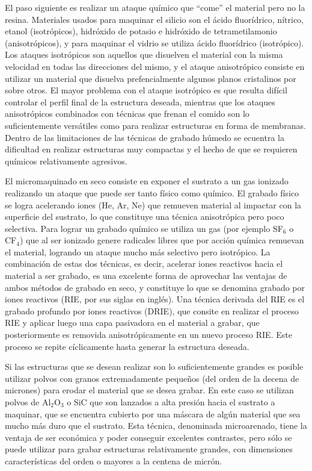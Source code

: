 \documentclass[a4paper, 12pt]{article}
\begin{document}
El paso siguiente es realizar un ataque químico que ``come'' el material pero no la resina. Materiales usados para maquinar el silicio son el ácido fluorídrico, nítrico, etanol (isotrópicos), hi\-dró\-xi\-do de potasio e hidróxido de tetrametilamonio (anisotrópicos), y para maquinar el vidrio se utiliza ácido fluorídrico (isotrópico). Los ataques isotrópicos son aquellos que disuelven el material con la misma velocidad en todas las direcciones del mismo, y el ataque anisotrópico consiste en utilizar un material que disuelva prefencialmente algunos planos cristalinos por sobre otros. El mayor problema con el ataque isotrópico es que resulta difícil controlar el perfil final de la estructura deseada, mientras que los ataques anisotrópicos combinados con técnicas que frenan el comido son lo suficientemente versátiles como para realizar estructuras en forma de membranas\cite{Gianchandani1992, Wallman2002}. Dentro de las limitaciones de las técnicas de grabado húmedo se ecuentra la dificultad en realizar estructuras muy compactas y el hecho de que se requieren químicos relativamente agresivos.

El micromaquinado en seco consiste en exponer el sustrato a un gas ionizado realizando un ataque que puede ser tanto físico como químico. El grabado físico se logra acelerando iones (He, Ar, Ne) que remueven material al impactar con la superficie del sustrato, lo que constituye una técnica anisotrópica pero poco selectiva. Para lograr un grabado químico se utiliza un gas (por ejemplo SF$_6$ o CF$_4$) que al ser ionizado genere radicales libres que por acción química remuevan el material, logrando un ataque mucho más selectivo pero isotrópico. La combinación de estas dos técnicas, es decir, acelerar iones reactivos hacia el material a ser grabado, es una excelente forma de aprovechar las ventajas de ambos métodos de grabado en seco, y constituye lo que se denomina grabado por iones reactivos (RIE, por sus siglas en inglés). Una técnica derivada del RIE es el grabado profundo por iones reactivos (DRIE), que consite en realizar el proceso RIE y aplicar luego una capa pasivadora en el material a grabar, que posteriormente es removida anisotrópicamente en un nuevo proceso RIE. Este proceso se repite cíclicamente hasta generar la estructura deseada.

Si las estructuras que se desean realizar son lo suficientemente grandes es posible utilizar polvos con granos extremadamente pequeños (del orden de la decena de micrones) para erodar el material que se desea grabar. En este caso se utilizan polvos de Al$_2$O$_3$ o SiC que son lanzados a alta presión hacia el sustrato a maquinar, que se encuentra cubierto por una máscara de algún material que sea mucho más duro que el sustrato. Esta técnica, denominada microarenado, tiene la ventaja de ser económica y poder conseguir excelentes contrastes, pero sólo se puede utilizar para grabar estructuras relativamente grandes, con dimensiones características del orden o mayores a la centena de micrón.
\end{document}
